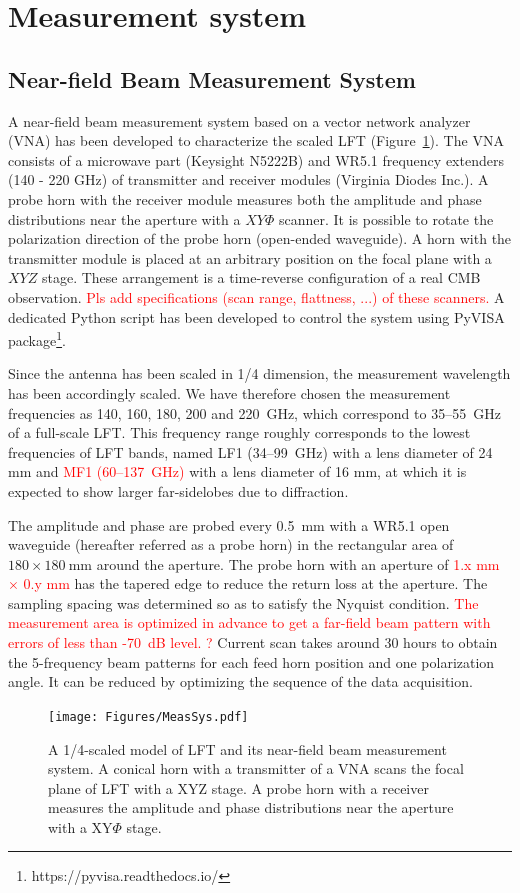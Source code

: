 \documentclass[journal]{IEEEtran}
\newcommand{\red}[1]{\textcolor{red}{#1}}
\begin{document}
\section{Measurement system}
%
\subsection{Near-field Beam Measurement System}
\par
A near-field beam measurement system based on a vector network analyzer (VNA) has been developed to characterize the scaled LFT (Figure~\ref{fig:MeasSys}). 
The VNA consists of a microwave part (Keysight N5222B) and WR5.1 frequency extenders (140 - 220 GHz) of transmitter and receiver modules (Virginia Diodes Inc.).
A probe horn with the receiver module measures both the amplitude and phase distributions near the aperture with a $XY\Phi$ scanner. It is possible to rotate the polarization direction of the probe horn (open-ended waveguide). 
A horn with the transmitter module is placed at an arbitrary position on the focal plane with a $XYZ$ stage.
These arrangement is a time-reverse configuration of a real CMB observation.
\red{Pls add specifications (scan range, flattness, ...) of these scanners.} 
A dedicated Python script has been developed to control the system using PyVISA package\footnote{https://pyvisa.readthedocs.io/}.
\par
Since the antenna has been scaled in 1/4 dimension, the measurement wavelength has been accordingly scaled. We have therefore chosen the measurement frequencies as 140, 160, 180, 200 and 220~GHz, which correspond to 35--55~GHz of a full-scale LFT. 
This frequency range roughly corresponds to the lowest frequencies of LFT bands, named LF1 (34--99~GHz) with a lens diameter of 24 mm and \red{MF1 (60--137~GHz)} with a lens diameter of 16 mm, at which it is expected to show larger far-sidelobes due to diffraction.  
\par
The amplitude and phase are probed every 0.5~mm with a WR5.1 open waveguide (hereafter referred as a probe horn) in the rectangular area of $180 \times 180~\mathrm{mm}$ around the aperture. The probe horn with an aperture of \red{1.x mm $\times$ 0.y mm} has the tapered edge to reduce the return loss at the aperture. The sampling spacing was determined so as to satisfy the Nyquist condition. \red{The measurement area is optimized in advance to get a far-field beam pattern with errors of less than -70~dB level. ?} 
Current scan takes around 30 hours to obtain the 5-frequency beam patterns for each feed horn position and one polarization angle. 
It can be reduced by optimizing the sequence of the data acquisition.
%
\begin{figure}[!t]
\centering
\texttt{[image: Figures/MeasSys.pdf]}
\caption{A 1/4-scaled model of LFT and its near-field beam measurement system. A conical horn with a transmitter of a VNA scans the focal plane of LFT with a XYZ stage. A probe horn with a receiver measures the amplitude and phase distributions near the aperture with a XY$\Phi$ stage. 
}
\label{fig:MeasSys}
\end{figure}
%
%
\end{document}
